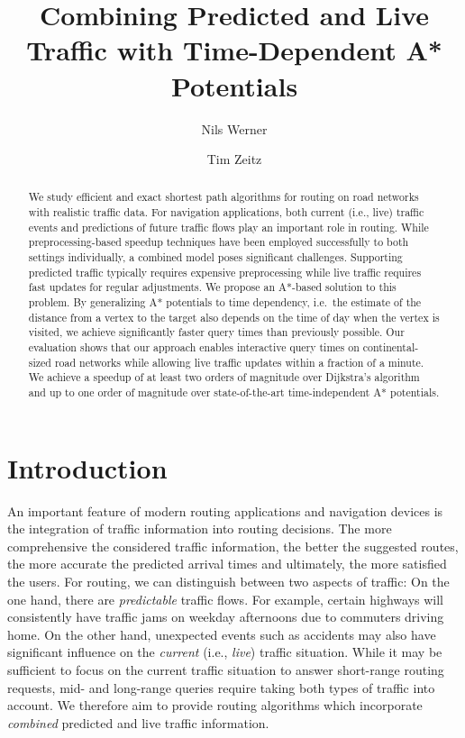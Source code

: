 \documentclass[a4paper,UKenglish,cleveref, autoref, thm-restate]{lipics-v2021}
\title{Combining Predicted and Live Traffic with Time-Dependent A* Potentials}
\author{Nils Werner}{Karlsruhe Institute of Technology, Germany}{}{}{}
\author{Tim Zeitz}{Karlsruhe Institute of Technology, Germany}{tim.zeitz@kit.edu}{https://orcid.org/0000-0003-4746-3582}{}
\begin{document}
\maketitle

\begin{abstract}
We study efficient and exact shortest path algorithms for routing on road networks with realistic traffic data.
For navigation applications, both current (i.e., live) traffic events and predictions of future traffic flows play an important role in routing.
While preprocessing-based speedup techniques have been employed successfully to both settings individually, a combined model poses significant challenges.
Supporting predicted traffic typically requires expensive preprocessing while live traffic requires fast updates for regular adjustments.
We propose an A*-based solution to this problem.
By generalizing A* potentials to time dependency, i.e.\ the estimate of the distance from a vertex to the target also depends on the time of day when the vertex is visited, we achieve significantly faster query times than previously possible.
Our evaluation shows that our approach enables interactive query times on continental-sized road networks while allowing live traffic updates within a fraction of a minute.
We achieve a speedup of at least two orders of magnitude over Dijkstra's algorithm and up to one order of magnitude over state-of-the-art time-independent A* potentials.
\end{abstract}

\section{Introduction}

An important feature of modern routing applications and navigation devices is the integration of traffic information into routing decisions.
The more comprehensive the considered traffic information, the better the suggested routes, the more accurate the predicted arrival times and ultimately, the more satisfied the users.
For routing, we can distinguish between two aspects of traffic:
On the one hand, there are \emph{predictable} traffic flows.
For example, certain highways will consistently have traffic jams on weekday afternoons due to commuters driving home.
On the other hand, unexpected events such as accidents may also have significant influence on the \emph{current} (i.e., \emph{live}) traffic situation.
While it may be sufficient to focus on the current traffic situation to answer short-range routing requests, mid- and long-range queries require taking both types of traffic into account.
We therefore aim to provide routing algorithms which incorporate \emph{combined} predicted and live traffic information.
\end{document}
